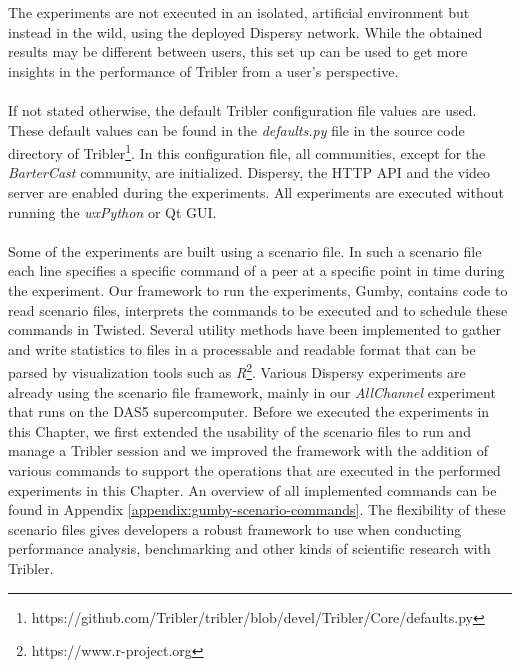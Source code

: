 The experiments are not executed in an isolated, artificial environment but instead in the wild, using the deployed Dispersy network. While the obtained results may be different between users, this set up can be used to get more insights in the performance of Tribler from a user's perspective.\\\\
If not stated otherwise, the default Tribler configuration file values are used. These default values can be found in the \emph{defaults.py} file in the source code directory of Tribler\footnote{https://github.com/Tribler/tribler/blob/devel/Tribler/Core/defaults.py}. In this configuration file, all communities, except for the \emph{BarterCast} community, are initialized. Dispersy, the HTTP API and the video server are enabled during the experiments. All experiments are executed without running the \emph{wxPython} or Qt GUI.\\\\
Some of the experiments are built using a scenario file. In such a scenario file each line specifies a specific command of a peer at a specific point in time during the experiment. Our framework to run the experiments, Gumby, contains code to read scenario files, interprets the commands to be executed and to schedule these commands in Twisted. Several utility methods have been implemented to gather and write statistics to files in a processable and readable format that can be parsed by visualization tools such as \emph{R}\footnote{https://www.r-project.org}. Various Dispersy experiments are already using the scenario file framework, mainly in our \emph{AllChannel} experiment that runs on the DAS5 supercomputer. Before we executed the experiments in this Chapter, we first extended the usability of the scenario files to run and manage a Tribler session and we improved the framework with the addition of various commands to support the operations that are executed in the performed experiments in this Chapter. An overview of all implemented commands can be found in Appendix \ref{appendix:gumby-scenario-commands}. The flexibility of these scenario files gives developers a robust framework to use when conducting performance analysis, benchmarking and other kinds of scientific research with Tribler.

